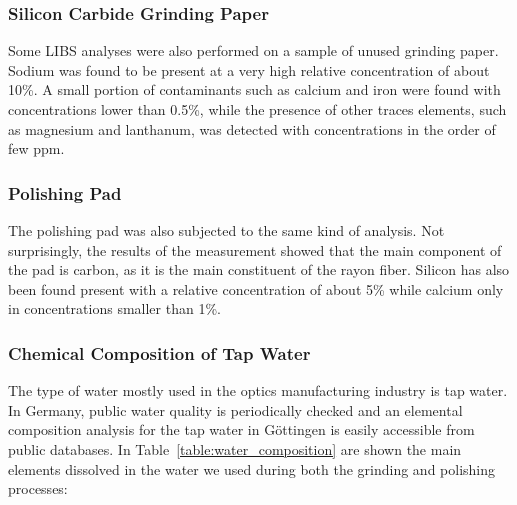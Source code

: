 \subsubsection{Silicon Carbide Grinding Paper}
\label{subsubsec:grinding_paper_meas}
Some LIBS analyses were also performed on a sample of unused grinding paper. Sodium was found to be present at a very high relative concentration of about 10\%. A small portion of contaminants such as calcium and iron were found with concentrations lower than 0.5\%, while the presence of other traces elements, such as magnesium and lanthanum, was detected with concentrations in the order of few ppm.

\subsubsection{Polishing Pad}
\label{subsubsec:polishing_pad_meas}
The polishing pad was also subjected to the same kind of analysis. Not surprisingly, the results of the measurement showed that the main component of the pad is carbon, as it is the main constituent of the rayon fiber. Silicon has also been found present with a relative concentration of about 5\% while calcium only in concentrations smaller than 1\%.


\subsubsection{Chemical Composition of Tap Water}
\label{subsubsec:tap_water_chemical_comp}
The type of water mostly used in the optics manufacturing industry is tap water. In Germany, public water quality is periodically checked and an elemental composition analysis for the tap water in Göttingen is easily accessible from public databases. In Table~\ref{table:water_composition} are shown the main elements dissolved in the water we used during both the grinding and polishing processes:

